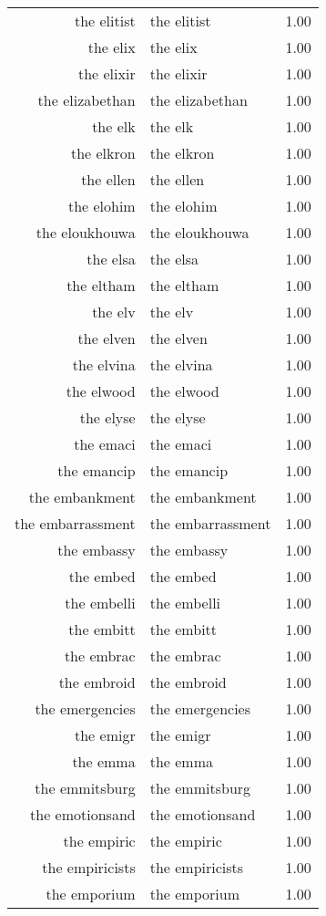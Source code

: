 \begin{table}[ht]
\begin{tabular}{rlr}
  the elitist & the elitist & 1.00 \\ 
  the elix & the elix & 1.00 \\ 
  the elixir & the elixir & 1.00 \\ 
  the elizabethan & the elizabethan & 1.00 \\ 
  the elk & the elk & 1.00 \\ 
  the elkron & the elkron & 1.00 \\ 
  the ellen & the ellen & 1.00 \\ 
  the elohim & the elohim & 1.00 \\ 
  the eloukhouwa & the eloukhouwa & 1.00 \\ 
  the elsa & the elsa & 1.00 \\ 
  the eltham & the eltham & 1.00 \\ 
  the elv & the elv & 1.00 \\ 
  the elven & the elven & 1.00 \\ 
  the elvina & the elvina & 1.00 \\ 
  the elwood & the elwood & 1.00 \\ 
  the elyse & the elyse & 1.00 \\ 
  the emaci & the emaci & 1.00 \\ 
  the emancip & the emancip & 1.00 \\ 
  the embankment & the embankment & 1.00 \\ 
  the embarrassment & the embarrassment & 1.00 \\ 
  the embassy & the embassy & 1.00 \\ 
  the embed & the embed & 1.00 \\ 
  the embelli & the embelli & 1.00 \\ 
  the embitt & the embitt & 1.00 \\ 
  the embrac & the embrac & 1.00 \\ 
  the embroid & the embroid & 1.00 \\ 
  the emergencies & the emergencies & 1.00 \\ 
  the emigr & the emigr & 1.00 \\ 
  the emma & the emma & 1.00 \\ 
  the emmitsburg & the emmitsburg & 1.00 \\ 
  the emotionsand & the emotionsand & 1.00 \\ 
  the empiric & the empiric & 1.00 \\ 
  the empiricists & the empiricists & 1.00 \\ 
  the emporium & the emporium & 1.00 \\ 

\end{tabular}
\end{table}
